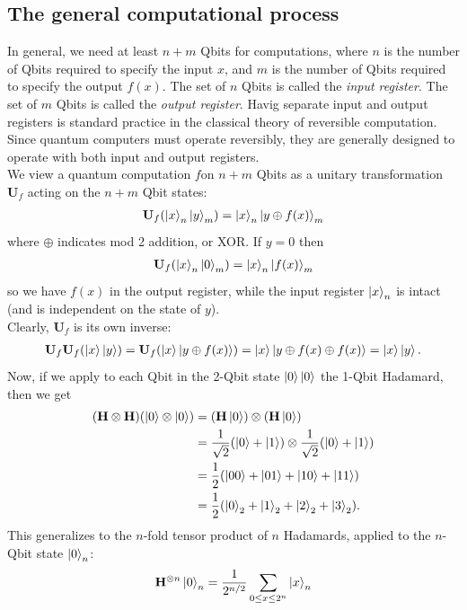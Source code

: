 \documentclass{book}
\theoremstyle{definition}
\newcommand{\nn}{\nonumber}
\newcommand{\f}[2]{\frac{#1}{#2}}
\newcommand{\had}{\mathbf{H}}
\begin{document}
\subsection{The general computational process}
In general, we need at least $n+m$ Qbits for computations, where $n$ is the number of Qbits required to specify the input $x$, and $m$ is the number of Qbits required to specify the output $f(x)$. The set of $n$ Qbits is called the \textit{input register}. The set of $m$ Qbits is called the \textit{output register}. Havig separate input and output registers is standard practice in the classical theory of reversible computation. Since quantum computers must operate reversibly, they are generally designed to operate with both input and output registers. \\

We view a quantum computation $f$on $n+m$ Qbits as a unitary transformation $\mathbf{U}_f$ acting on the $n+m$ Qbit states:
\begin{align}
\mathbf{U}_f (\ket{x}_n\ket{y}_m) = \ket{x}_n \ket{y\oplus f(x)}_m
\end{align}
where $\oplus$ indicates mod 2 addition, or XOR. If $y=0$  then 
\begin{align}
\mathbf{U}_f(\ket{x}_n \ket{0}_m) = \ket{x}_n \ket{f(x)}_m
\end{align}
so we have $f(x)$ in the output register, while the input register $\ket{x}_n$ is intact (and is independent on the state of $y$). \\

Clearly, $\mathbf{U}_f$ is its own inverse:
\begin{align}
\mathbf{U}_f\mathbf{U}_f (\ket{x}\ket{y}) = \mathbf{U}_f(\ket{x}\ket{y\oplus f(x)}) = \ket{x}\ket{y\oplus f(x)\oplus f(x)} =\ket{x}\ket{y}.
\end{align} 
Now, if we apply to each Qbit in the 2-Qbit state $\ket{0}\ket{0}$ the 1-Qbit Hadamard, then we get
\begin{align}
(\had \otimes \had)(\ket{0}\otimes \ket{0}) &= (\had\ket{0})\otimes(\had\ket{0})\nn\\
&= \f{1}{\sqrt{2}}(\ket{0} + \ket{1}) \otimes \f{1}{\sqrt{2}}(\ket{0} + \ket{1})\nn\\
&= \f{1}{2}(\ket{00} + \ket{01} + \ket{10} + \ket{11})\nn\\
&= \f{1}{2}(\ket{0}_2 + \ket{1}_2 + \ket{2}_2 + \ket{3}_2).
\end{align}
This generalizes to the $n$-fold tensor product of $n$ Hadamards, applied to the $n$-Qbit state $\ket{0}_n$:
\begin{align}
{\had^{\otimes n}\ket{0}_n = \f{1}{2^{n/2}}\sum_{0 \leq x \leq 2^n} \ket{x}_n}
\end{align}
\end{document}
